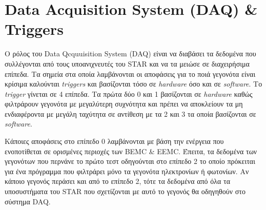 \section{Data Acquisition System (DAQ) \& Triggers}

Ο ρόλος του Data Qcquuisition System (DAQ) είναι να διαβάσει τα δεδομένα που συλλέγονται από τους υποανιχνευτές του STAR και να τα μειώσε σε διαχειρήσιμα επίπεδα. Τα σημεία στα οποία λαμβάνονται οι αποφάσεις για το ποιά γεγονότα είναι κρίσιμα καλούνται \textit{triggers} και βασίζονται τόσο σε \textit{hardware}  όσο και σε \textit{software}. 
	Το \textit{trigger} γίνεται σε 4 επίπεδα. Τα πρώτα δύο 0 και 1 βασίζονται σε \textit{hardware} καθώς φιλτράρουν γεγονότα με μεγαλύτερη συχνότητα και πρέπει να αποκλείουν τα μη ενδιαφέροντα με μεγάλη ταχύτητα σε αντίθεση με τα 2 και 3 τα οποία βασίζονται σε \textit{software}.
	
	Κάποιες αποφάσεις στο επίπεδο 0 λαμβάνονται με βάση την ενέργεια που ενοποτίθεται σε ορισμένες περιοχές των BEMC \& EEMC. Έπειτα, τα δεδομένα των γεγονότων που περνάνε το πρώτο τεστ οδηγούνται στο επίπεδο 2 το οποίο πρόκειται για ένα πρόγραμμα που φιλτράρει μόνο τα γεγονότα ηλεκτρονίων ή φωτονίων. Αν κάποιο γεγονός περάσει και από το επίπεδο 2, τότε τα δεδομένα από όλα τα υποσυστήματα του STAR που σχετίζονται με αυτό το γεγονός θα οδηγηθούν στο σύστημα DAQ.